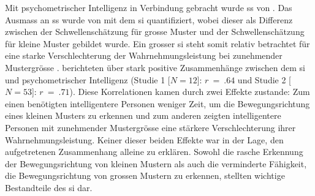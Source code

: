 \documentclass[11pt, twoside, a4paper]{book}		%
\begin{document}
Mit psychometrischer Intelligenz in Verbindung gebracht wurde \gls{ss} von \citet{Melnick2013}.
Das Ausmass an \gls{ss} wurde von \citeauthor{Melnick2013} mit dem \gls{si} quantifiziert, wobei dieser als Differenz zwischen der Schwellenschätzung für grosse Muster und der Schwellenschätzung für kleine Muster gebildet wurde. Ein grosser \gls{si} steht somit relativ betrachtet für eine starke Verschlechterung der Wahrnehmungsleistung bei zunehmender Mustergrösse \citep[das heisst einer stark ausgeprägten \gls{ss};][]{Tadin2006}. \citeauthor{Melnick2013} berichteten über stark positive Zusammenhänge zwischen dem \gls{si} und psychometrischer Intelligenz (Studie 1 [$N=12$]: $r~=~.64$ und Studie 2 [$N=53$]: $r~=~.71$). Diese Korrelationen kamen durch zwei Effekte zustande: Zum einen benötigten intelligentere Personen weniger Zeit, um die Bewegungsrichtung eines kleinen Musters zu erkennen und zum anderen zeigten intelligentere Personen mit zunehmender Mustergrösse eine stärkere Verschlechterung ihrer Wahrnehmungsleistung. Keiner dieser beiden Effekte war in der Lage, den aufgetretenen Zusammenhang alleine zu erklären. Sowohl die rasche Erkennung der Bewegungsrichtung von kleinen Mustern als auch die verminderte Fähigkeit, die Bewegungsrichtung von grossen Mustern zu erkennen, stellten wichtige Bestandteile des \gls{si} dar. 
\end{document}
